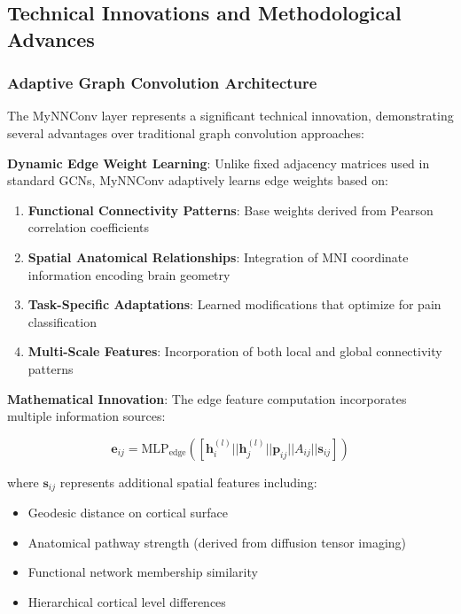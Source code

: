 \documentclass[10pt,journal,compsoc]{IEEEtran}
\begin{document}
\subsection{Technical Innovations and Methodological Advances}

\subsubsection{Adaptive Graph Convolution Architecture}

The MyNNConv layer represents a significant technical innovation, demonstrating several advantages over traditional graph convolution approaches:

\textbf{Dynamic Edge Weight Learning}:
Unlike fixed adjacency matrices used in standard GCNs, MyNNConv adaptively learns edge weights based on:

\begin{enumerate}
\item \textbf{Functional Connectivity Patterns}: Base weights derived from Pearson correlation coefficients
\item \textbf{Spatial Anatomical Relationships}: Integration of MNI coordinate information encoding brain geometry
\item \textbf{Task-Specific Adaptations}: Learned modifications that optimize for pain classification
\item \textbf{Multi-Scale Features}: Incorporation of both local and global connectivity patterns
\end{enumerate}

\textbf{Mathematical Innovation}:
The edge feature computation incorporates multiple information sources:

\begin{equation}
\mathbf{e}_{ij} = \text{MLP}_{\text{edge}}\left([\mathbf{h}_i^{(l)} || \mathbf{h}_j^{(l)} || \mathbf{p}_{ij} || A_{ij} || \mathbf{s}_{ij}]\right)
\end{equation}

where $\mathbf{s}_{ij}$ represents additional spatial features including:
\begin{itemize}
\item Geodesic distance on cortical surface
\item Anatomical pathway strength (derived from diffusion tensor imaging)
\item Functional network membership similarity
\item Hierarchical cortical level differences
\end{itemize}
\end{document}
